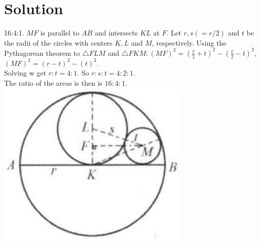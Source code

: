 \documentclass{article}
\begin{document}
\section*{Solution}
16:4:1.
\(M F\) is parallel to \(A B\) and intersects \(K L\) at \(F\). Let \(r, s(=r / 2)\) and \(t\) be the radii of the circles with centers \(K, L\) and \(M\), respectively. Using the Pythagorean theorem to \(\triangle F L M\) and \(\triangle F K M:(M F)^{2}=\left(\frac{r}{2}+t\right)^{2}-\left(\frac{r}{2}-t\right)^{2}\), \((M F)^{2}=(r-t)^{2}-(t)^{2}\).\\
Solving w get \(r: t=4: 1\). So \(r: s: t=4: 2: 1\).\\
The ratio of the areas is then is \(16: 4: 1\).\\
\centering
\includegraphics[width=\textwidth]{images/189.jpg}
\end{document}
